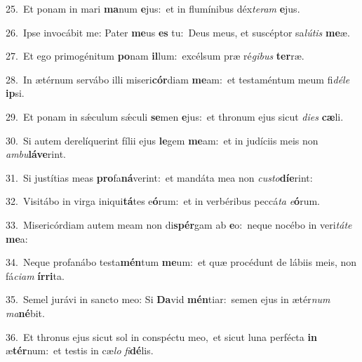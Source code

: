{\numbfont\textcolor{\numbcolor}{25.}}~Et ponam in mari \textbf{ma}\-num \textbf{e}\-jus:~\star et in flumínibus déx\-\textit{te}\-\textit{ram} \textbf{e}\-jus.\par
{\numbfont\textcolor{\numbcolor}{26.}}~Ipse invocábit me: Pater \textbf{me}\-us \textbf{es} tu:~\star Deus meus, et suscéptor sa\-\textit{lú}\-\textit{tis} \textbf{me}\-æ.\par
{\numbfont\textcolor{\numbcolor}{27.}}~Et ego primogénitum \textbf{po}\-nam \textbf{il}\-lum:~\star excélsum præ ré\-\textit{gi}\-\textit{bus} \textbf{ter}\-ræ.\par
{\numbfont\textcolor{\numbcolor}{28.}}~In ætérnum servábo illi miseri\-\textbf{cór}\-diam \textbf{me}\-am:~\star et testaméntum meum fi\-\textit{dé}\-\textit{le} \textbf{ip}\-si.\par
{\numbfont\textcolor{\numbcolor}{29.}}~Et ponam in sǽculum sǽculi \textbf{se}\-men \textbf{e}\-jus:~\star et thronum ejus sicut \textit{di}\-\textit{es} \textbf{cæ}\-li.\par
{\numbfont\textcolor{\numbcolor}{30.}}~Si autem derelíquerint fílii ejus \textbf{le}\-gem \textbf{me}\-am:~\star et in judíciis meis non \textit{am}\-\textit{bu}\textbf{lá}\textbf{ve}rint.\par
{\numbfont\textcolor{\numbcolor}{31.}}~Si justítias meas \textbf{pro}\-fa\-\textbf{ná}\-verint:~\star et mandáta mea non \textit{cus}\-\textit{to}\textbf{dí}\textbf{e}rint:\par
{\numbfont\textcolor{\numbcolor}{32.}}~Visitábo in virga iniqui\-\textbf{tá}\-tes e\-\textbf{ó}\-rum:~\star et in verbéribus peccá\textit{ta} \textit{e}\-\textbf{ó}rum.\par
{\numbfont\textcolor{\numbcolor}{33.}}~Misericórdiam autem meam non di\-\textbf{spér}\-gam ab \textbf{e}\-o:~\star neque nocébo in veri\-\textit{tá}\-\textit{te} \textbf{me}\-a:\par
{\numbfont\textcolor{\numbcolor}{34.}}~Neque profanábo testa\-\textbf{mén}\-tum \textbf{me}\-um:~\star et quæ procédunt de lábiis meis, non fá\-\textit{ci}\-\textit{am} \textbf{ír}\-\textbf{ri}ta.\par
{\numbfont\textcolor{\numbcolor}{35.}}~Semel jurávi in sancto meo: Si \textbf{Da}\-vid \textbf{mén}\-tiar:~\star semen ejus in ætér\textit{num} \textit{ma}\-\textbf{né}bit.\par
{\numbfont\textcolor{\numbcolor}{36.}}~Et thronus ejus sicut sol in conspéctu meo,~\dagger et sicut luna perfécta \textbf{in} æ\-\textbf{tér}\-num:~\star et testis in cæ\textit{lo} \textit{fi}\-\textbf{dé}lis.\par
